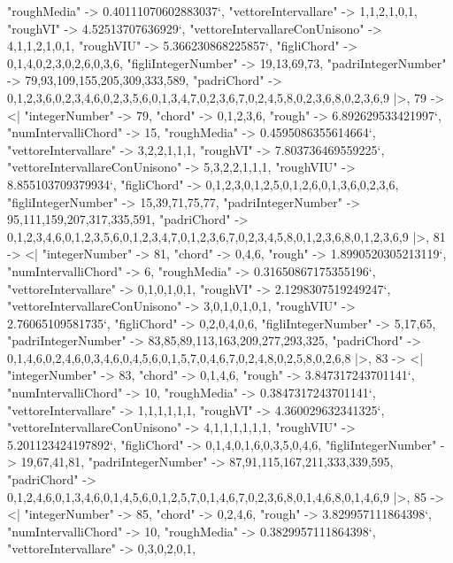 \documentclass[
]{article}
\begin{document}
\begin{DatasetVerbatim}
    "roughMedia" -> 0.40111070602883037`,
    "vettoreIntervallare" -> {1,1,2,1,0,1},
    "roughVI" -> 4.52513707636929`,
    "vettoreIntervallareConUnisono" -> {4,1,1,2,1,0,1},
    "roughVIU" -> 5.366230868225857`,
    "figliChord" -> {{0,1,4},{0,2,3},{0,2,6},{0,3,6}},
    "figliIntegerNumber" -> {19,13,69,73},
    "padriIntegerNumber" -> {79,93,109,155,205,309,333,589},
    "padriChord" -> {{0,1,2,3,6},{0,2,3,4,6},{0,2,3,5,6},{0,1,3,4,7},{0,2,3,6,7},{0,2,4,5,8},{0,2,3,6,8},{0,2,3,6,9}}
  |>,
  79 -> <|
    "integerNumber" -> 79,
    "chord" -> {0,1,2,3,6},
    "rough" -> 6.892629533421997`,
    "numIntervalliChord" -> 15,
    "roughMedia" -> 0.4595086355614664`,
    "vettoreIntervallare" -> {3,2,2,1,1,1},
    "roughVI" -> 7.803736469559225`,
    "vettoreIntervallareConUnisono" -> {5,3,2,2,1,1,1},
    "roughVIU" -> 8.855103709379934`,
    "figliChord" -> {{0,1,2,3},{0,1,2,5},{0,1,2,6},{0,1,3,6},{0,2,3,6}},
    "figliIntegerNumber" -> {15,39,71,75,77},
    "padriIntegerNumber" -> {95,111,159,207,317,335,591},
    "padriChord" -> {{0,1,2,3,4,6},{0,1,2,3,5,6},{0,1,2,3,4,7},{0,1,2,3,6,7},{0,2,3,4,5,8},{0,1,2,3,6,8},{0,1,2,3,6,9}}
  |>,
  81 -> <|
    "integerNumber" -> 81,
    "chord" -> {0,4,6},
    "rough" -> 1.8990520305213119`,
    "numIntervalliChord" -> 6,
    "roughMedia" -> 0.31650867175355196`,
    "vettoreIntervallare" -> {0,1,0,1,0,1},
    "roughVI" -> 2.1298307519249247`,
    "vettoreIntervallareConUnisono" -> {3,0,1,0,1,0,1},
    "roughVIU" -> 2.76065109581735`,
    "figliChord" -> {{0,2},{0,4},{0,6}},
    "figliIntegerNumber" -> {5,17,65},
    "padriIntegerNumber" -> {83,85,89,113,163,209,277,293,325},
    "padriChord" -> {{0,1,4,6},{0,2,4,6},{0,3,4,6},{0,4,5,6},{0,1,5,7},{0,4,6,7},{0,2,4,8},{0,2,5,8},{0,2,6,8}}
  |>,
  83 -> <|
    "integerNumber" -> 83,
    "chord" -> {0,1,4,6},
    "rough" -> 3.847317243701141`,
    "numIntervalliChord" -> 10,
    "roughMedia" -> 0.3847317243701141`,
    "vettoreIntervallare" -> {1,1,1,1,1,1},
    "roughVI" -> 4.360029632341325`,
    "vettoreIntervallareConUnisono" -> {4,1,1,1,1,1,1},
    "roughVIU" -> 5.201123424197892`,
    "figliChord" -> {{0,1,4},{0,1,6},{0,3,5},{0,4,6}},
    "figliIntegerNumber" -> {19,67,41,81},
    "padriIntegerNumber" -> {87,91,115,167,211,333,339,595},
    "padriChord" -> {{0,1,2,4,6},{0,1,3,4,6},{0,1,4,5,6},{0,1,2,5,7},{0,1,4,6,7},{0,2,3,6,8},{0,1,4,6,8},{0,1,4,6,9}}
  |>,
  85 -> <|
    "integerNumber" -> 85,
    "chord" -> {0,2,4,6},
    "rough" -> 3.829957111864398`,
    "numIntervalliChord" -> 10,
    "roughMedia" -> 0.3829957111864398`,
    "vettoreIntervallare" -> {0,3,0,2,0,1},

\end{DatasetVerbatim}
\end{document}
